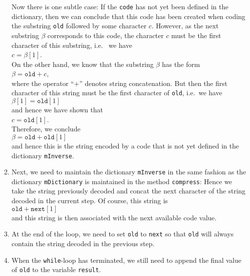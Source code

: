 \begin{enumerate}
      Now there is one subtle case: If the \texttt{code} has not yet been defined in the
      dictionary,  then we can conclude that this code has been created when coding the
      substring \texttt{old} followed by some character $c$.  However, as the next substring $\beta$
      corresponds to this code, the character $c$ must be the first
      character of this substring, i.e.~ we have
      \\[0.2cm]
      \hspace*{1.3cm}
      $c = \beta[1]$.
      \\[0.2cm]
      On the other hand, we know that the substring $\beta$ has the form
      \\[0.2cm]
      \hspace*{1.3cm}
      $\beta = \mathtt{old} + c$,
      \\[0.2cm]
      where the operator ``$+$'' denotes string concatenation.  But then the first character of this string
      must be the first character of \texttt{old}, i.e.~we have
      \\[0.2cm]
      \hspace*{1.3cm}
      $\beta[1] = \mathtt{old}[1]$
      \\[0.2cm]
      and hence we have shown that
      \\[0.2cm]
      \hspace*{1.3cm}
      $c = \mathtt{old}[1]$.
      \\[0.2cm]
      Therefore, we conclude
      \\[0.2cm]
      \hspace*{1.3cm}
      $\beta = \mathtt{old} + \mathtt{old}[1]$
      \\[0.2cm]
      and hence this is the string encoded by a code that is not yet defined in the dictionary
      \texttt{mInverse}.
\item Next, we need to maintain the dictionary \texttt{mInverse} in the same fashion as the
      dictionary \texttt{mDictionary} is maintained in the method \texttt{compress}:
      Hence we take the string previously decoded and concat the next character of the
      string decoded in the current step.  Of course, this string is
      \\[0.2cm]
      \hspace*{1.3cm}
      $\texttt{old} + \mathtt{next}[1]$
      \\[0.2cm]
      and this string is then associated with the next available code value.
\item At the end of the loop, we need to set \texttt{old} to \texttt{next} so that \texttt{old}
      will always contain the string decoded in the previous step.
\item When the \texttt{while}-loop has terminated, we still need to append the final value of \texttt{old}
      to the variable \texttt{result}.
\end{enumerate}
